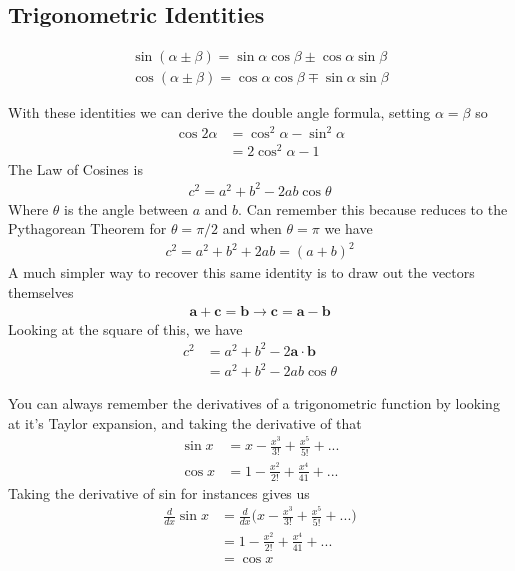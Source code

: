 \subsection{Trigonometric Identities}

\begin{align}
\sin(\alpha\pm\beta) = \sin\alpha\cos\beta\pm\cos\alpha\sin\beta\\
\cos(\alpha\pm\beta) = \cos\alpha\cos\beta\mp\sin\alpha\sin\beta
\end{align}

With these identities we can derive the double angle formula, setting $\alpha = \beta$ so
\begin{align}
\cos2\alpha &= \cos^2\alpha -\sin^2\alpha\\
&= 2\cos^2\alpha-1
\end{align}
The Law of Cosines is 
\begin{align}
c^2 = a^2 + b^2 -2ab\cos\theta
\end{align}
Where $\theta$ is the angle between $a$ and $b$. Can remember this because reduces to the Pythagorean Theorem for $\theta = \pi/2$ and when $\theta = \pi$ we have
\begin{align}
c^2 = a^2 + b^2 +2ab = (a+b)^2
\end{align}
A much simpler way to recover this same identity is to draw out the vectors themselves
\begin{align}
	\textbf{a} + \textbf{c} = \textbf{b} \rightarrow \textbf{c} = \textbf{a} - \textbf{b}
\end{align}
Looking at the square of this, we have
\begin{align}
	c^2 &= a^2 + b^2 - 2\textbf{a}\cdot\textbf{b}\\
	&= a^2 + b^2 -2ab\cos\theta 
\end{align}

You can always remember the derivatives of a trigonometric function by looking at it's Taylor expansion, and taking the derivative of that
\begin{align}
	\sin x &= x - \frac{x^3}{3!} + \frac{x^5}{5!} + ...\\
	\cos x &= 1 - \frac{x^2}{2!} + \frac{x^4}{41} + ...
\end{align}
Taking the derivative of sin for instances gives us
\begin{align}
	\frac{d}{dx}\sin x &= \frac{d}{dx}\Big( x - \frac{x^3}{3!} + \frac{x^5}{5!} + ...\Big)\\
	&= 1 - \frac{x^2}{2!} + \frac{x^4}{41} + ...\\
	&= \cos x
\end{align}


